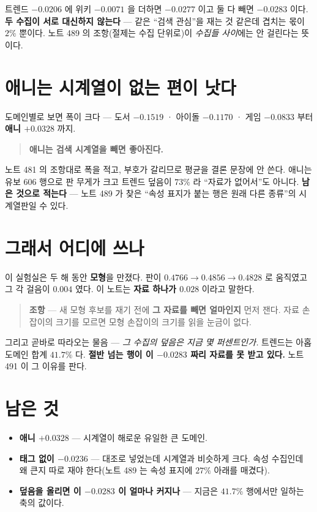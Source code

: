 \documentclass[11pt]{article}
\begin{document}
트렌드 $-0.0206$ 에 위키 $-0.0071$ 을 더하면 $-0.0277$ 이고 둘 다 빼면
$-0.0283$ 이다. \textbf{두 수집이 서로 대신하지 않는다} --- 같은 ``검색
관심''을 재는 것 같은데 겹치는 몫이 $2\%$ 뿐이다. 노트 489 의 조항(절제는
수집 단위로)이 \emph{수집들 사이}에는 안 걸린다는 뜻이다.

\section{애니는 시계열이 없는 편이 낫다}

도메인별로 보면 폭이 크다 --- 도서 $-0.1519$ · 아이돌 $-0.1170$ · 게임
$-0.0833$ 부터 \textbf{애니 $+0.0328$} 까지.

\begin{quote}
\textbf{애니는 검색 시계열을 빼면 좋아진다.}
\end{quote}

노트 481 의 조항대로 폭을 적고, 부호가 갈리므로 평균을 결론 문장에 안
쓴다. 애니는 유보 $606$ 행으로 판 무게가 크고 트렌드 덮음이 $73\%$ 라
``자료가 없어서''도 아니다. \textbf{남은 것으로 적는다} --- 노트 489 가
찾은 ``속성 표지가 붙는 행은 원래 다른 종류''의 시계열판일 수 있다.

\section{그래서 어디에 쓰나}

이 실험실은 두 해 동안 \textbf{모형}을 만졌다. 판이 $0.4766 \to 0.4856
\to 0.4828$ 로 움직였고 그 각 걸음이 $0.004$ 였다. 이 노트는 \textbf{자료
하나가 $0.028$} 이라고 말한다.

\begin{quote}
\textbf{조항} --- 새 모형 후보를 재기 전에 \textbf{그 자료를 빼면 얼마인지}
먼저 잰다. 자료 손잡이의 크기를 모르면 모형 손잡이의 크기를 읽을 눈금이
없다.
\end{quote}

그리고 곧바로 따라오는 물음 --- \emph{그 수집의 덮음은 지금 몇 퍼센트인가.}
트렌드는 아홉 도메인 합계 $41.7\%$ 다. \textbf{절반 넘는 행이 이
$-0.0283$ 짜리 자료를 못 받고 있다.} 노트 491 이 그 이유를 판다.

\section*{남은 것}

\begin{itemize}
\item \textbf{애니 $+0.0328$} --- 시계열이 해로운 유일한 큰 도메인.
\item \textbf{태그 없이 $-0.0236$} --- 대조로 넣었는데 시계열과 비슷하게
크다. 속성 수집인데 왜 큰지 따로 재야 한다(노트 489 는 속성 표지에
$27\%$ 아래를 매겼다).
\item \textbf{덮음을 올리면 이 $-0.0283$ 이 얼마나 커지나} --- 지금은
$41.7\%$ 행에서만 일하는 축의 값이다.
\end{itemize}
\end{document}
